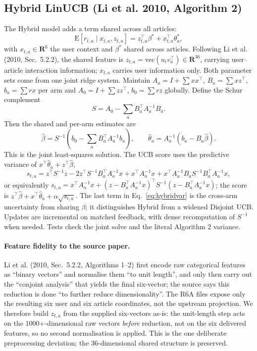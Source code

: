 \documentclass[10pt,a4paper]{article}
\newcommand{\E}{\mathrm{E}}
\begin{document}
\subsection{Hybrid LinUCB (Li et al. 2010, Algorithm 2)}
The Hybrid model adds a term shared across all articles:
\begin{equation}
\E[r_{t,a}\mid x_{t,a},z_{t,a}]
= z_{t,a}^\top\beta^* + x_{t,a}^\top\theta_a^*,
\label{eq:hybridmean}
\end{equation}
with $x_{t,a}\in\mathbf R^6$ the user context and $\beta^*$ shared across
articles. Following Li et al. (2010, Sec.~5.2.2), the shared feature is
$z_{t,a}=\mathrm{vec}(u_t v_a^\top)\in\mathbf R^{36}$, carrying
user--article interaction information; $x_{t,a}$ carries user information
only. Both parameter sets come from one joint ridge system. Maintain
$A_a=I+\sum xx^\top$, $B_a=\sum xz^\top$, $b_a=\sum rx$ per arm and
$A_0=I+\sum zz^\top$, $b_0=\sum rz$ globally. Define the Schur complement
\begin{equation}
S=A_0-\sum_a B_a^\top A_a^{-1}B_a .
\label{eq:schur}
\end{equation}
Then the shared and per-arm estimates are
\begin{equation}
\hat\beta=S^{-1}\!\left(b_0-\sum_a B_a^\top A_a^{-1}b_a\right),\qquad
\hat\theta_a=A_a^{-1}\left(b_a-B_a\hat\beta\right).
\label{eq:hybridfit}
\end{equation}
This is the joint least-squares solution. The UCB score uses the predictive
variance of $x^\top\hat\theta_a+z^\top\hat\beta$,
\begin{equation}
s_{t,a}=z^\top S^{-1}z-2z^\top S^{-1}B_a^\top A_a^{-1}x
+x^\top A_a^{-1}x+x^\top A_a^{-1}B_a S^{-1}B_a^\top A_a^{-1}x,
\label{eq:hybridvar}
\end{equation}
or equivalently $s_{t,a}=x^\top A_a^{-1}x+(z-B_a^\top A_a^{-1}x)^\top
S^{-1}(z-B_a^\top A_a^{-1}x)$; the score is
$z^\top\hat\beta+x^\top\hat\theta_a+\alpha\sqrt{s_{t,a}}$. The last term
in Eq.~\eqref{eq:hybridvar} is the cross-arm uncertainty from sharing
$\beta$; it distinguishes Hybrid from a widened Disjoint UCB. Updates are
incremental on matched feedback, with dense recomputation of $S^{-1}$ when
needed. Tests check the joint solve and the literal Algorithm 2 variance.

\paragraph{Feature fidelity to the source paper.}
Li et al. (2010, Sec.~5.2.2, Algorithms 1--2) first encode raw categorical features as
``binary vectors'' and normalise them ``to unit length'', and only then
carry out the ``conjoint analysis'' that yields the final six-vector; the
source says this reduction is done ``to further reduce dimensionality''.
The R6A files expose only the resulting six user and six article
coordinates, not the upstream projection. We therefore build $z_{t,a}$
from the supplied six-vectors as-is: the unit-length step acts on the
1000+-dimensional raw vectors \emph{before} reduction, not on the six
delivered features, so no second normalisation is applied. This is the one
deliberate preprocessing deviation; the 36-dimensional shared structure
is preserved.
\end{document}
